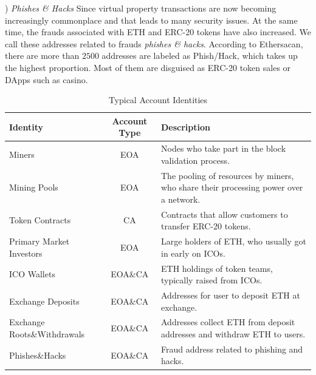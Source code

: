 ) \emph{Phishes \& Hacks}
Since virtual property transactions are now becoming increasingly commonplace and that leads to many security issues. At the same time, the frauds associated with ETH and ERC-20 tokens have also increased. We call these addresses related to frauds \emph{phishes \& hacks}. According to Ethersacan, there are more than $2500$ addresses are labeled as Phish/Hack, which takes up the highest proportion. Most of them are disguised as ERC-20 token sales or DApps such as casino.

\begin{table}[t]
\caption{Typical Account Identities}
\begin{center}
\begin{tabular}{|p{2.1cm}|c|p{3.9cm}|}
\hline
\textbf{Identity} & \textbf{Account Type}& \textbf{Description} \\
\hline
Miners & EOA & Nodes who take part in the block validation process. \\ \hline
Mining Pools & EOA & The pooling of resources by miners, who share their processing power over a network.\\ \hline
Token Contracts & CA & Contracts that allow customers to transfer ERC-20 tokens. \\ \hline
Primary Market Investors & EOA & Large holders of ETH, who usually got in early on ICOs. \\ \hline
ICO Wallets & EOA\&CA & ETH holdings of token teams, typically raised from ICOs. \\ \hline
Exchange Deposits & EOA\&CA & Addresses for user to deposit ETH at exchange. \\ \hline
Exchange Roots\&Withdrawals & EOA\&CA & Addresses collect ETH from deposit addresses and withdraw ETH to users. \\ \hline
Phishes\&Hacks & EOA\&CA & Fraud address related to phishing and hacks. \\ \hline
\end{tabular}
\label{table:identity}
\end{center}
\end{table}




